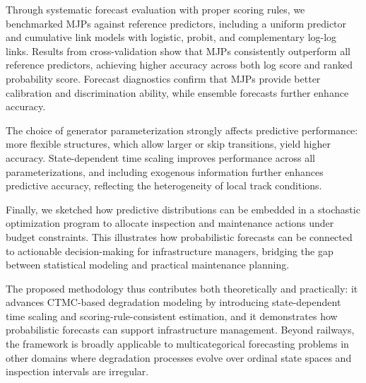 Through systematic forecast evaluation with proper scoring rules, we benchmarked MJPs against reference predictors, including a uniform predictor and cumulative link models with logistic, probit, and complementary log-log links. Results from cross-validation show that MJPs consistently outperform all reference predictors, achieving higher accuracy across both log score and ranked probability score. Forecast diagnostics confirm that MJPs provide better calibration and discrimination ability, while ensemble forecasts further enhance accuracy.

The choice of generator parameterization strongly affects predictive performance: more flexible structures, which allow larger or skip transitions, yield higher accuracy. State-dependent time scaling improves performance across all parameterizations, and including exogenous information further enhances predictive accuracy, reflecting the heterogeneity of local track conditions.

Finally, we sketched how predictive distributions can be embedded in a stochastic optimization program to allocate inspection and maintenance actions under budget constraints. This illustrates how probabilistic forecasts can be connected to actionable decision-making for infrastructure managers, bridging the gap between statistical modeling and practical maintenance planning.

The proposed methodology thus contributes both theoretically and practically: it advances CTMC-based degradation modeling by introducing state-dependent time scaling and scoring-rule-consistent estimation, and it demonstrates how probabilistic forecasts can support infrastructure management. Beyond railways, the framework is broadly applicable to multicategorical forecasting problems in other domains where degradation processes evolve over ordinal state spaces and inspection intervals are irregular.

